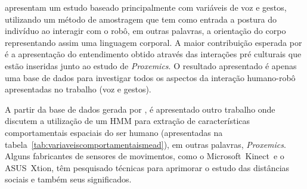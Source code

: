  apresentam um estudo baseado principalmente com variáveis de voz e gestos, utilizando um método de amostragem que tem como entrada a postura do indivíduo ao interagir com o robô, em outras palavras, a orientação do corpo representando assim uma linguagem corporal. A maior contribuição esperada por  é a apresentação do entendimento obtido através das interações pré culturais que estão inseridas junto ao estudo de \emph{Proxemics}. O resultado apresentado é apenas uma base de dados para investigar todos os aspectos da interação humano-robô apresentadas no trabalho (voz e gestos).

A partir da base de dados gerada por , é apresentado outro trabalho onde  discutem a utilização de um HMM para extração de características comportamentais espaciais do ser humano (apresentadas na tabela~\ref{tab:variaveiscomportamentaismead}), em outras palavras, \emph{Proxemics}. Alguns fabricantes de sensores de movimentos, como o Microsoft\textregistered\ Kinect\textregistered\ e o ASUS\textregistered\ Xtion, têm pesquisado técnicas para aprimorar o estudo das distâncias sociais e também seus significados.

